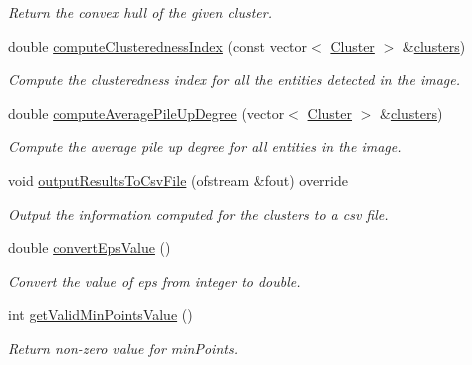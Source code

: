 \begin{DoxyCompactItemize}
\begin{DoxyCompactList}\small\item\em Return the convex hull of the given cluster. \end{DoxyCompactList}\item 
double \hyperlink{classmultiscale_1_1analysis_1_1ClusterDetector_aaa7937daf9872614e09b23cb4f6e5aa8}{compute\-Clusteredness\-Index} (const vector$<$ \hyperlink{classmultiscale_1_1analysis_1_1Cluster}{Cluster} $>$ \&\hyperlink{classmultiscale_1_1analysis_1_1ClusterDetector_aa81a8649bc743389c2fc1919d47eb5b3}{clusters})
\begin{DoxyCompactList}\small\item\em Compute the clusteredness index for all the entities detected in the image. \end{DoxyCompactList}\item 
double \hyperlink{classmultiscale_1_1analysis_1_1ClusterDetector_a1efab8446c79feb8a9285d895bb64b05}{compute\-Average\-Pile\-Up\-Degree} (vector$<$ \hyperlink{classmultiscale_1_1analysis_1_1Cluster}{Cluster} $>$ \&\hyperlink{classmultiscale_1_1analysis_1_1ClusterDetector_aa81a8649bc743389c2fc1919d47eb5b3}{clusters})
\begin{DoxyCompactList}\small\item\em Compute the average pile up degree for all entities in the image. \end{DoxyCompactList}\item 
void \hyperlink{classmultiscale_1_1analysis_1_1ClusterDetector_a6137f44f74afcac0584b1ff3f49f0ab8}{output\-Results\-To\-Csv\-File} (ofstream \&fout) override
\begin{DoxyCompactList}\small\item\em Output the information computed for the clusters to a csv file. \end{DoxyCompactList}\item 
double \hyperlink{classmultiscale_1_1analysis_1_1ClusterDetector_afccb86bfb93df00fff8408faea7a2651}{convert\-Eps\-Value} ()
\begin{DoxyCompactList}\small\item\em Convert the value of eps from integer to double. \end{DoxyCompactList}\item 
int \hyperlink{classmultiscale_1_1analysis_1_1ClusterDetector_ab1c2514fb8599f74bf010e81154a9bf7}{get\-Valid\-Min\-Points\-Value} ()
\begin{DoxyCompactList}\small\item\em Return non-\/zero value for min\-Points. \end{DoxyCompactList}\end{DoxyCompactItemize}
